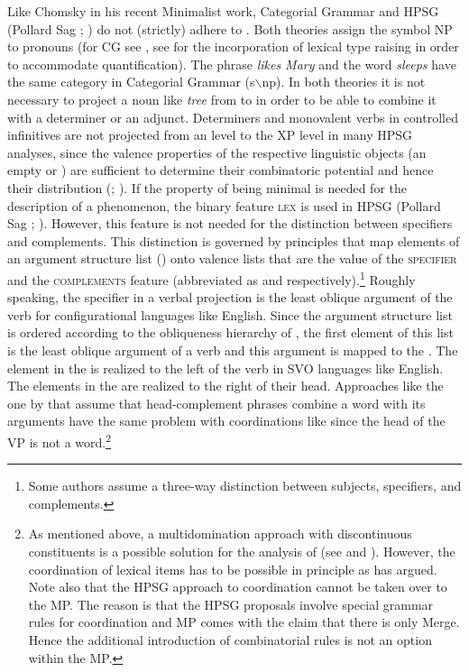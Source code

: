 Like Chomsky in his recent Minimalist work, Categorial Grammar \citep{Ajdukiewicz35a-u} and HPSG
(Pollard \biband Sag \citeyear{ps}; \citeyear[--40]{ps2}) do not (strictly) adhere to
\xbart. Both theories assign the symbol NP to pronouns (for CG see , see
 for the incorporation of lexical type raising in order to accommodate
quantification). The phrase \emph{likes Mary} and the word \emph{sleeps} have the same category in Categorial Grammar (s$\backslash$np). In both theories it is not
necessary to project a noun like \emph{tree} from \nnull to \nbar in order to be able to combine it
with a determiner or an adjunct. Determiners and monovalent verbs in controlled infinitives are
not projected from an \xzero level to the XP level in many HPSG analyses, since the valence
properties of the respective linguistic objects (an empty \subcat or \compsl) are sufficient to
determine their combinatoric potential and hence their distribution (\citealp{Mueller96a};
\citealp{Mueller99a}). If the property of being minimal is needed for the description of a 
phenomenon, the binary feature \textsc{lex} is used in HPSG (Pollard \biband Sag \citeyear[]{ps};
\citeyear[]{ps2}). However, this feature is not needed for the distinction between
specifiers and complements. This distinction is governed by principles that map elements of an
argument structure list (\argst) onto valence lists that are the value of the \textsc{specifier} and
the \textsc{complements} feature (abbreviated as \spr and \comps respectively).\footnote{%
  Some authors assume a three-way distinction between subjects, specifiers, and complements.
} Roughly speaking, the specifier in a verbal projection is the least oblique argument of the verb for
configurational languages like English. Since the argument structure list is ordered according to
the obliqueness hierarchy of \citet{KC77a}, the first element of this list is the least oblique
argument of a verb and this argument is mapped to the \sprl. The element in the \sprl is realized to the left of the
verb in SVO languages like English. The elements in the \compsl are realized to the right of their
head. Approaches like the one by \citet[, 364]{GSag2000a-u} that assume that
head-complement phrases combine a word with its arguments have the same problem with coordinations
like  since the head of the VP is not a word.\footnote{%
  As mentioned above, a multidomination approach with discontinuous constituents is a possible
  solution for the analysis of   (see
  \citealp{Crysmann2000a} and \citealp{BS2004a}). However, the coordination of lexical items has to be possible in
  principle as \citet{Abeille2006a} has argued. Note also that the HPSG approach to coordination
  cannot be taken over to the MP. The reason is that the HPSG proposals involve special grammar
  rules for coordination and MP comes with the claim that there is only Merge. Hence the additional
  introduction of combinatorial rules is not an option within the MP.
} 
